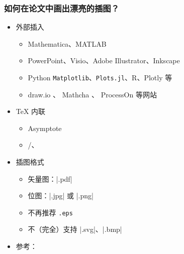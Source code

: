 \begin{frame}[fragile]
\frametitle{如何在论文中画出漂亮的插图？}
\begin{itemize}
  \item<+-> 外部插入

    \begin{itemize}
      \item Mathematica、MATLAB
      \item PowerPoint、Visio、Adobe Illustrator、Inkscape
      \item Python \texttt{Matplotlib}、\texttt{Plots.jl}、R、Plotly 等
      \item draw.io 、
            Mathcha 、
            ProcessOn  等网站
    \end{itemize}

  \item<+-> \TeX{} 内联

    \begin{itemize}
      \item Asymptote
      \item \alert{/、}
    \end{itemize}

  \item<+-> 插图格式

    \begin{itemize}
      \item 矢量图：|.pdf|
      \item 位图：|.jpg| 或 |.png|
      \item \alert{不再推荐 \texttt{.eps}}
      \item 不（完全）支持 |.svg|、|.bmp|
    \end{itemize}

  \item<+-> 参考：
\end{itemize}
\end{frame}

